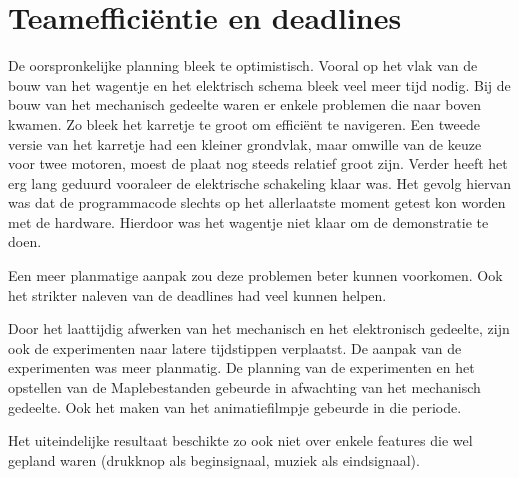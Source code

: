 \section{Teamefficiëntie en deadlines}
\label{section:teamefficientie}

De oorspronkelijke planning bleek te optimistisch. Vooral op het vlak van de bouw van het wagentje en het elektrisch schema bleek veel meer tijd nodig.
Bij de bouw van het mechanisch gedeelte waren er enkele problemen die naar boven kwamen. Zo bleek het karretje te groot om efficiënt te navigeren.
Een tweede versie van het karretje had een kleiner grondvlak, maar omwille van de keuze voor twee motoren, moest de plaat nog steeds relatief groot zijn.
Verder heeft het erg lang geduurd vooraleer de elektrische schakeling klaar was. Het gevolg hiervan was dat de programmacode slechts op het allerlaatste moment getest kon worden  met de hardware. Hierdoor was het wagentje niet klaar om de demonstratie te doen.

Een meer planmatige aanpak zou deze problemen beter kunnen voorkomen. Ook het strikter naleven van de deadlines had veel kunnen helpen.

Door het laattijdig afwerken van het mechanisch en het elektronisch gedeelte, zijn ook de experimenten naar latere tijdstippen verplaatst. De aanpak van de experimenten was meer planmatig.
De planning van de experimenten en het opstellen van de Maplebestanden gebeurde in afwachting van het mechanisch gedeelte. Ook het maken van het animatiefilmpje gebeurde in die periode.

Het uiteindelijke resultaat beschikte zo ook niet over enkele features die wel gepland waren (drukknop als beginsignaal, muziek als eindsignaal). 